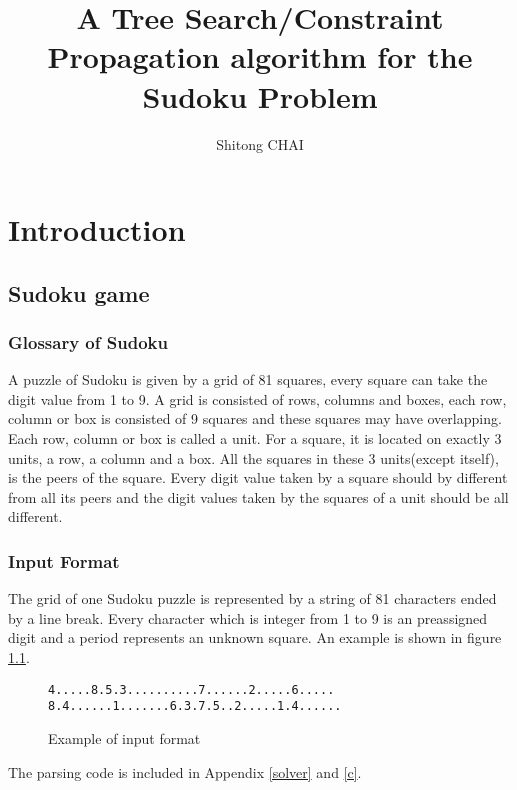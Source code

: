 \documentclass[a4paper, 12pt]{report}
\title{A Tree Search/Constraint Propagation algorithm for the Sudoku Problem}
\date{}
\author{Shitong CHAI}
\begin{document}
\maketitle
\tableofcontents

\chapter{Introduction}

    \section {Sudoku game}
        \subsection {Glossary of Sudoku}
            A puzzle of Sudoku is given by a grid of 81 squares, every square can take the digit value from 1 to 9. A grid is consisted of rows, columns and boxes, each row, column or box is consisted of 9 squares and these squares may have overlapping. Each row, column or box is called a unit. For a square, it is located on exactly 3 units, a row, a column and a box. All the squares in these 3 units(except itself), is the peers of the square. Every digit value taken by a square should by
            different from all its peers and the digit values taken by the squares of a unit should be all different.

        \subsection {Input Format}

            The grid of one Sudoku puzzle is represented by a string of 81 characters ended by a line break. Every character which is integer from 1 to 9 is an preassigned digit and a period represents an unknown square. An example is shown in figure \ref{examplesudoku}.
            \begin{figure}[H]
                \begin{lstlisting}[frame=single]
4.....8.5.3..........7......2.....6..... 8.4......1.......6.3.7.5..2.....1.4......
                \end{lstlisting}
                \label{examplesudoku}
                \caption{Example of input format}
            \end{figure}

            The parsing code is included in Appendix \ref{solver} and \ref{c}.
\end{document}
